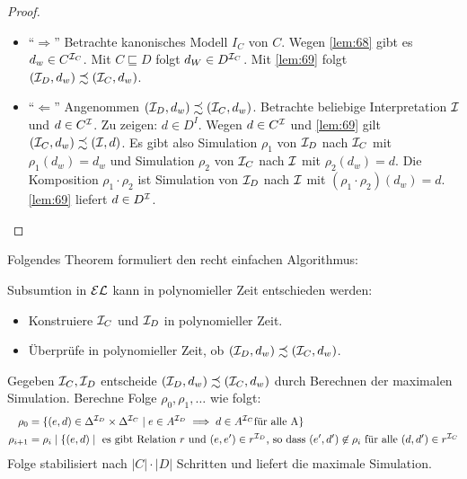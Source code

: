 \begin{tafel}
    \begin{proof}\mbox{}
\begin{itemize}
    \item \enquote{$\Rightarrow$}
  Betrachte kanonisches Modell $I_{C}$ von $C$. Wegen
  \autoref{lem:68} gibt es $d_w \in C^{\mathcal{I}_C}$. Mit $C \sqsubseteq D$
  folgt $d_{W} \in D^{\mathcal{I}_C}$. Mit \autoref{lem:69}
  folgt $(\mathcal{I}_D, d_w) \precsim (\mathcal{I}_C, d_w)$.
\item \enquote{$\Leftarrow$}
  Angenommen
  $\left( \MI_D,d_w \right) \precsim \left( \MI_C,d_w \right)$.
  Betrachte beliebige Interpretation $\mathcal{I}$ und $d \in C^{\mathcal{I}}$. Zu
  zeigen: $d \in D^{I}$. Wegen $d \in C^{\mathcal{I}}$ und
  \autoref{lem:69} gilt
  $\left( \MI_C,d_w \right) \precsim \left( \MI,d \right)$.
  Es gibt also Simulation $\rho_1$ von $\mathcal{I}_D$ nach $\mathcal{I}_C$ mit $\rho_1(d_w) = d_w$ und Simulation $\rho_2$ von $\mathcal{I}_C$ nach $\mathcal{I}$ mit $\rho_2(d_w)=d$. Die Komposition $\rho_1 \cdot \rho_2$ ist Simulation von $\mathcal{I}_D$ nach $\mathcal{I}$ mit $(\rho_1 \cdot \rho_2)(d_w) = d$. \autoref{lem:69} liefert $d \in D^{\mathcal{I}}$.
\end{itemize}
\end{proof}
\end{tafel}

Folgendes Theorem formuliert den recht einfachen Algorithmus:
\begin{theorem}
    Subsumtion in $\mathcal{E}\mathcal{L}$ kann in polynomieller Zeit entschieden werden:

\begin{itemize}
\item
  Konstruiere $\mathcal{I}_{C}$ und $\mathcal{I}_{D}$ in polynomieller Zeit.
\item
  Überprüfe in polynomieller Zeit, ob
  $\left( \MI_D,d_w \right) \precsim \left( \MI_C,d_w \right)$.
\end{itemize}
\end{theorem}

\begin{tafel}
    Gegeben $\mathcal{I}_C, \mathcal{I}_D$ entscheide $(\mathcal{I}_D, d_w) \precsim (\mathcal{I}_C, d_w)$ durch Berechnen der maximalen Simulation.
    Berechne Folge $\rho_0, \rho_1, \ldots$ wie folgt:
    \begin{align*}
        \rho_0 &= \{(e, d) \in \Delta^{\mathcal{I}_D} \times \Delta^{\mathcal{I}_C} \mid e \in A^{\mathcal{I}_D} \implies d \in A^{\mathcal{I}_C} \text{für alle A}\}\\
        \rho_{i + 1} &= \rho_i \mid \{(e, d) \mid\ \text{es gibt Relation}\ r\ \text{und}\ (e, e')\in r^{\mathcal{I}_D}\text{, so dass}\ (e', d') \not\in \rho_i\ \text{für alle}\ (d, d') \in r^{\mathcal{I}_C}
    \end{align*}
    Folge stabilisiert nach $|C| \cdot |D|$ Schritten und liefert die maximale Simulation.
\end{tafel}

